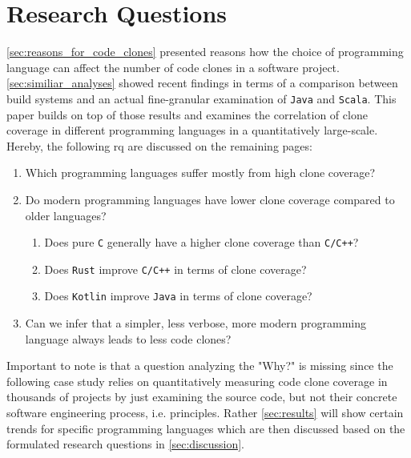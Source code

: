 
\section{Research Questions}
\label{sec:research_question}

\autoref{sec:reasons_for_code_clones} presented reasons how the choice of programming language can affect the number of code clones in a software project. \autoref{sec:similiar_analyses} showed recent findings in terms of a comparison between build systems and an actual fine-granular examination of \texttt{Java} and \texttt{Scala}.
This paper builds on top of those results and examines the correlation of clone coverage in different programming languages in a quantitatively large-scale. Hereby, the following \ac{rq} are discussed on the remaining pages:

\begin{enumerate}
	\item Which programming languages suffer mostly from high clone coverage?
	\item Do modern programming languages have lower clone coverage compared to older languages?
	\begin{enumerate}
		\item Does pure \texttt{C} generally have a higher clone coverage than \texttt{C/C++}?
		\item Does \texttt{Rust} improve \texttt{C/C++} in terms of clone coverage?
		\item Does \texttt{Kotlin} improve \texttt{Java} in terms of clone coverage?
	\end{enumerate}
	\item Can we infer that a simpler, less verbose, more modern programming language always leads to less code clones?
\end{enumerate}

Important to note is that a question analyzing the "Why?" is missing since the following case study relies on quantitatively measuring code clone coverage in thousands of projects by just examining the source code, but not their concrete software engineering process, i.e. principles. Rather \autoref{sec:results} will show certain trends for specific programming languages which are then discussed based on the formulated research questions in \autoref{sec:discussion}.